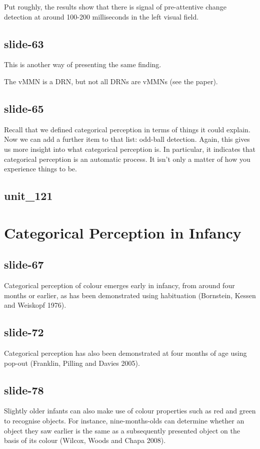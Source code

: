 \documentclass[12pt,\papersize]{extarticle}
\begin{document}
Put roughly, the results show that there is signal of pre-attentive change detection at around 100-200 milliseconds in the left visual field.

\subsection{slide-63}
This is another way of presenting the same finding.

The vMMN is a DRN, but not all DRNs are vMMNs (see the paper).

\subsection{slide-65}
Recall that we defined categorical perception in terms of things it could explain.
Now we can add a further item to that list: odd-ball detection.
Again, this gives us more insight into what categorical perception is.
In particular, it indicates that categorical perception is an automatic process.
It isn't only a matter of how you experience things to be.

\subsection{unit\_121}


\section{Categorical Perception in Infancy}

\subsection{slide-67}
Categorical perception of colour emerges early in infancy, from around four months or earlier, as has been demonstrated using habituation (Bornstein, Kessen
and Weiskopf 1976).

\subsection{slide-72}
Categorical perception has also been demonstrated at four months of age using pop-out (Franklin, Pilling and Davies 2005).

\subsection{slide-78}
Slightly older infants can also make use of colour properties such as red and green to recognise objects.  For instance, nine-months-olds can determine whether an object they saw earlier is the same as a subsequently presented object on the basis of its colour (Wilcox, Woods and Chapa 2008).
\end{document}
